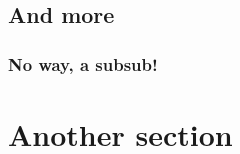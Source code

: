 \lipsum[3-6] %

\subsection{And more}

\lipsum[7-9] %

\subsubsection{No way, a subsub!}

\lipsum[10-12] %


\section{Another section}
\label{sec:section2}

\lipsum[13-19] %
